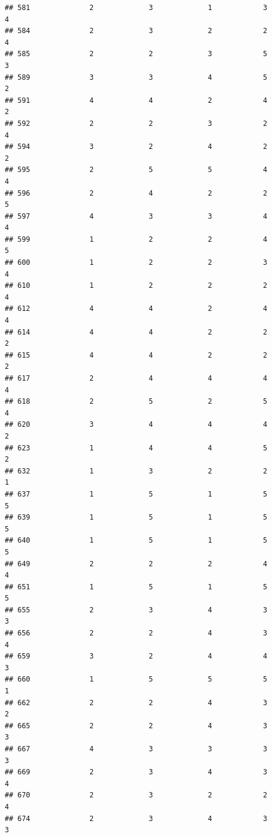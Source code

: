 \documentclass[
]{article}
\begin{document}
\begin{verbatim}
## 581              2             3             1            3          4
## 584              2             3             2            2          4
## 585              2             2             3            5          3
## 589              3             3             4            5          2
## 591              4             4             2            4          2
## 592              2             2             3            2          4
## 594              3             2             4            2          2
## 595              2             5             5            4          4
## 596              2             4             2            2          5
## 597              4             3             3            4          4
## 599              1             2             2            4          5
## 600              1             2             2            3          4
## 610              1             2             2            2          4
## 612              4             4             2            4          4
## 614              4             4             2            2          2
## 615              4             4             2            2          2
## 617              2             4             4            4          4
## 618              2             5             2            5          4
## 620              3             4             4            4          2
## 623              1             4             4            5          2
## 632              1             3             2            2          1
## 637              1             5             1            5          5
## 639              1             5             1            5          5
## 640              1             5             1            5          5
## 649              2             2             2            4          4
## 651              1             5             1            5          5
## 655              2             3             4            3          3
## 656              2             2             4            3          4
## 659              3             2             4            4          3
## 660              1             5             5            5          1
## 662              2             2             4            3          2
## 665              2             2             4            3          3
## 667              4             3             3            3          3
## 669              2             3             4            3          4
## 670              2             3             2            2          4
## 674              2             3             4            3          3

\end{verbatim}
\end{document}
